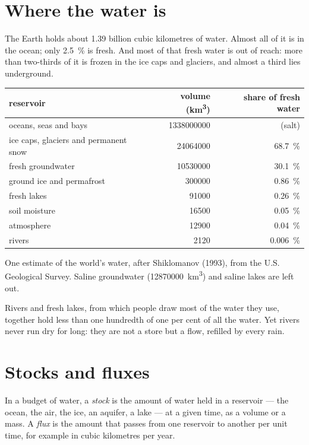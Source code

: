 \section{Where the water is}

The Earth holds about 1.39 billion cubic kilometres of water. Almost all of it
is in the ocean; only \qty{2.5}{\percent} is fresh. And most of that fresh
water is out of reach: more than two-thirds of it is frozen in the ice caps
and glaciers, and almost a third lies underground.

\begin{center}
\small
\begin{tabular}{|l|r|r|}
\hline
\textbf{reservoir} & \textbf{volume (\unit{km^3})} & \textbf{share of fresh water} \\ \hline
oceans, seas and bays & \num{1338000000} & (salt) \\ \hline
ice caps, glaciers and permanent snow & \num{24064000} & \qty{68.7}{\percent} \\ \hline
fresh groundwater & \num{10530000} & \qty{30.1}{\percent} \\ \hline
ground ice and permafrost & \num{300000} & \qty{0.86}{\percent} \\ \hline
fresh lakes & \num{91000} & \qty{0.26}{\percent} \\ \hline
soil moisture & \num{16500} & \qty{0.05}{\percent} \\ \hline
atmosphere & \num{12900} & \qty{0.04}{\percent} \\ \hline
rivers & \num{2120} & \qty{0.006}{\percent} \\ \hline
\end{tabular}

{\small One estimate of the world's water, after Shiklomanov (1993), from the
U.S. Geological Survey. Saline groundwater (\num{12870000}~\unit{km^3}) and
saline lakes are left out.}
\end{center}

Rivers and fresh lakes, from which people draw most of the water they use,
together hold less than one hundredth of one per cent of all the water. Yet
rivers never run dry for long: they are not a store but a flow, refilled by
every rain.

\section{Stocks and fluxes}

\begin{definition}\label{def:g10:freshwater-resources:stock}
In a budget of water, a \emph{stock} is the amount
of water held in a reservoir --- the ocean, the air, the ice, an aquifer, a
lake --- at a given time, as a volume or a mass. A
\emph{flux} is the amount that passes from one reservoir to another per unit
time, for example in cubic kilometres per year.
\end{definition}

